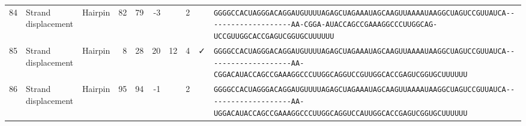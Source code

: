 \begin{tabular}{rllrrrrrcl}
 84 & Strand displacement & Hairpin & 82 & 79 & -3 &   & 2 &  &
 \color{ucsfdarkgrey}\verb|GGGGCCACUAGGGACAGGAU|\color{ucsforange}\verb|GUUUUA|\color{ucsfblue}\verb|GAGCUAGAAAUAGCAAGU|\color{ucsforange}\verb|UAAAAUAA|\color{ucsfnavy}\verb|GGCUAGUCCGU|\color{ucsforange}\verb|UAUCA|\color{ucsfteal}\verb|--------------------AA-CGGA-|\color{ucsfpurple}\verb|AUACCAGCCGAAAGGCCCUUGGCAG|\color{ucsfteal}\verb|-UCCGUU|\color{ucsforange}\verb|GGCACCGAGUCGGUGCUUUUUU| \\

 85 & Strand displacement & Hairpin & 8 & 28 & 20 & 12 & 4 & ✓ &
 \color{ucsfdarkgrey}\verb|GGGGCCACUAGGGACAGGAU|\color{ucsforange}\verb|GUUUUA|\color{ucsfblue}\verb|GAGCUAGAAAUAGCAAGU|\color{ucsforange}\verb|UAAAAUAA|\color{ucsfnavy}\verb|GGCUAGUCCGU|\color{ucsforange}\verb|UAUCA|\color{ucsfteal}\verb|--------------------AA-CGGAC|\color{ucsfpurple}\verb|AUACCAGCCGAAAGGCCCUUGGCAG|\color{ucsfteal}\verb|GUCCGUU|\color{ucsforange}\verb|GGCACCGAGUCGGUGCUUUUUU| \\

 86 & Strand displacement & Hairpin & 95 & 94 & -1 &   & 2 &  &
 \color{ucsfdarkgrey}\verb|GGGGCCACUAGGGACAGGAU|\color{ucsforange}\verb|GUUUUA|\color{ucsfblue}\verb|GAGCUAGAAAUAGCAAGU|\color{ucsforange}\verb|UAAAAUAA|\color{ucsfnavy}\verb|GGCUAGUCCGU|\color{ucsforange}\verb|UAUCA|\color{ucsfteal}\verb|--------------------AA-UGGAC|\color{ucsfpurple}\verb|AUACCAGCCGAAAGGCCCUUGGCAG|\color{ucsfteal}\verb|GUCCAUU|\color{ucsforange}\verb|GGCACCGAGUCGGUGCUUUUUU| \\

\bottomrule
\end{tabular}
